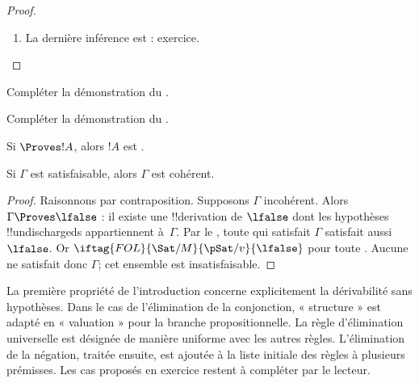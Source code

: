 \documentclass[11pt,a4paper,openany]{memoir}
\begin{document}
\begin{proof}
\begin{enumerate}
\item La dernière inférence est \Elim{\lnot} : exercice.

\end{enumerate}
\end{proof}

\begin{prob}
Compléter la démonstration du .
\end{prob}
\tagendprob

\begin{prob}
Compléter la démonstration du .
\end{prob}
\tagendprob

\begin{cor}
Si $\Proves !A$, alors $!A$ est .
\end{cor}

\begin{cor}
Si $\Gamma$ est satisfaisable, alors $\Gamma$ est cohérent.
\end{cor}

\begin{proof}
Raisonnons par contraposition. Supposons $\Gamma$ incohérent.
Alors $\Gamma \Proves \lfalse$ : il existe une !!{derivation}
de $\lfalse$ dont les hypothèses !!{undischarged}s appartiennent
à~$\Gamma$. Par le , toute
qui satisfait $\Gamma$ satisfait aussi $\lfalse$.
Or $\iftag{FOL}{\Sat/{M}}{\pSat/{v}}{\lfalse}$ pour toute
.
Aucune 
ne satisfait donc $\Gamma$; cet ensemble est insatisfaisable.
\end{proof}

\begin{editorial}
La première propriété de l'introduction concerne explicitement
la dérivabilité sans hypothèses. Dans le cas de l'élimination de
la conjonction, « structure » est adapté en « valuation » pour la
branche propositionnelle. La règle d'élimination universelle est
désignée de manière uniforme avec les autres règles.
L'élimination de la négation, traitée ensuite, est ajoutée à la
liste initiale des règles à plusieurs prémisses. Les cas proposés
en exercice restent à compléter par le lecteur.
\end{editorial}
\end{document}
